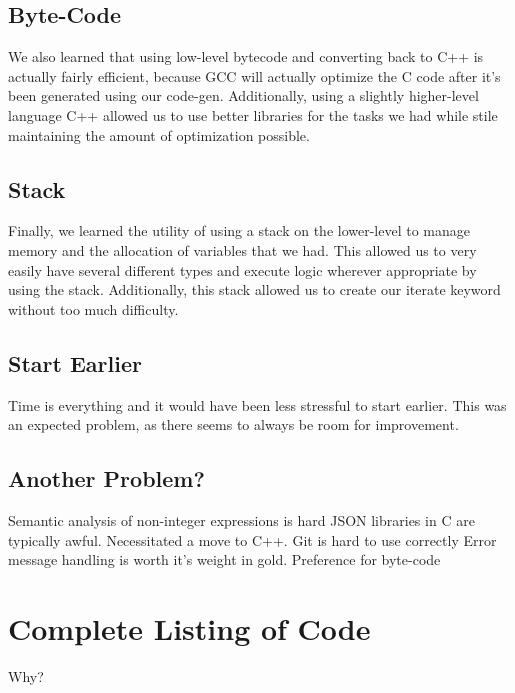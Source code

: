 \documentclass[12pt]{article}
\begin{document}
\subsection{Byte-Code}
We also learned that using low-level bytecode and converting back to C++ is actually fairly efficient, because GCC will actually optimize the C code after it's been generated using our code-gen.  Additionally, using a slightly higher-level language C++ allowed us to use better libraries for the tasks we had while stile maintaining the amount of optimization possible.
\subsection{Stack}
Finally, we learned the utility of using a stack on the lower-level to manage memory and the allocation of variables that we had.  This allowed us to very easily have several different types and execute logic wherever appropriate by using the stack.  Additionally, this stack allowed us to create our iterate keyword without too much difficulty.


\subsection{Start Earlier}
Time is everything and it would have been less stressful to start earlier. This was an expected problem, as there seems to always be room for improvement.

\subsection{Another Problem?}
Semantic analysis of non-integer expressions is hard
JSON libraries in C are typically awful. Necessitated a move to    C++.
Git is hard to use correctly
Error message handling is worth it's weight in gold.
Preference for byte-code


\section{Complete Listing of Code}
Why?
\end{document}
